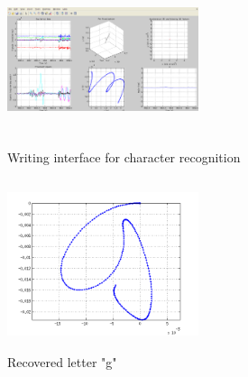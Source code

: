 \documentclass{article}
\begin{document}
\begin{figure}[H]
\centering
    \includegraphics[width=0.5\textwidth, height= 5cm]{interface.png}
    \caption{Writing interface for character recognition}
\end{figure}

\begin{figure}[H]
\centering
    \includegraphics[width=0.5\textwidth, height= 5cm]{g.png}
    \caption{Recovered letter "g"}
\end{figure}


\end{document}
